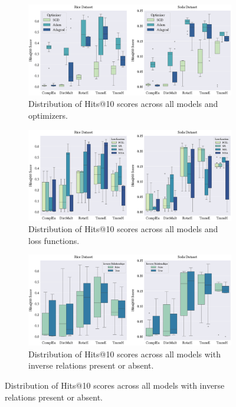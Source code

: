 \begin{figure}[!ht]
    \centering
    \begin{subfigure}[b]{\textwidth}
        \centering
        \includegraphics[width=1\textwidth]{figures/hits@10_across_all_models_and_optimizers.eps}
        \caption{Distribution of Hits@10 scores across all models and optimizers.}
        \label{subfig:hits@10_across_all_models_and_optimizers}
    \end{subfigure}
    
    \begin{subfigure}[b]{\textwidth}
        \centering
        \includegraphics[width=1\textwidth]{figures/hits@10_across_all_models_and_loss_functions.eps}
        \caption{Distribution of Hits@10 scores across all models and loss functions.}
        \label{subfig:hits@10_across_all_models_and_loss_functions}
    \end{subfigure}
    
    \begin{subfigure}[b]{\textwidth}
        \centering
        \includegraphics[width=1\textwidth]{figures/hits@10_across_all_models_with_inverse_relations_present_or_absent.eps}
        \caption{Distribution of Hits@10 scores across all models with inverse relations present or absent.}
        \label{subfig:hits@10_across_all_models_with_inverse_relations_present_or_absent}
    \end{subfigure}
    

\end{figure}
